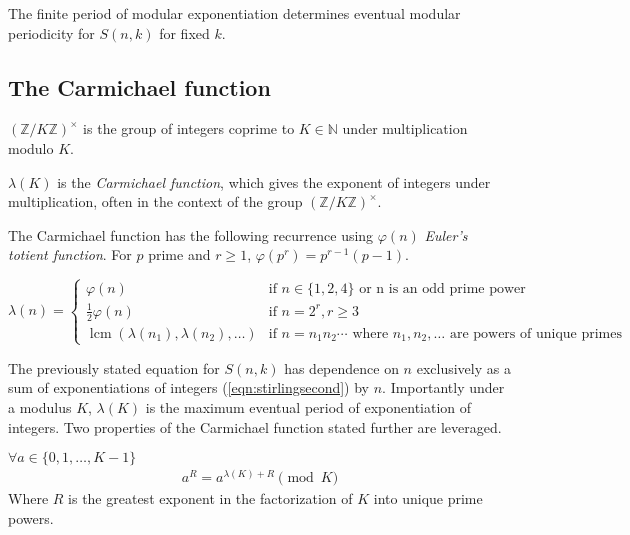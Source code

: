 \documentclass[12pt,reqno]{article}
\DeclareMathOperator{\lcm}{lcm}
\begin{document}
The finite period of modular exponentiation determines eventual modular periodicity for $S(n,k)$ for fixed $k$.

\subsection{The Carmichael function}
\begin{definition}
	$(\mathbb{Z}/K\mathbb{Z})^{\times}$ is the group of integers coprime to $K \in \mathbb{N}$ under multiplication modulo $K$.
\end{definition}
\begin{definition}
	$\lambda(K)$ is the {\em Carmichael function}, which gives the exponent of integers under multiplication, often in the context of the group $(\mathbb{Z}/K\mathbb{Z})^{\times}$.
\end{definition}

The Carmichael function has the following recurrence \cite{cc:carmichaelwiki} using $\varphi(n)$ {\em Euler's totient function}. For $p$ prime and $r \geq 1$, $\varphi(p^{r}) = p^{r - 1} (p - 1)$.

\begin{equation}
	\lambda(n) = \begin{cases}
		\varphi(n) & \text{if } n \in \{1,2,4\} \text{ or n is an odd prime power}
		\\
		\frac{1}{2}\varphi(n) & \text{if } n = 2^{r}, r \geq 3
		\\
		\lcm (\lambda(n_{1}), \lambda(n_{2}), \ldots) & \text{if } n = n_{1}n_{2} \cdots \text{ where } n_{1}, n_{2}, \ldots \text{ are powers of unique primes}
	\end{cases}\label{eqn:carmichaelrecur}
\end{equation}



The previously stated equation for $S(n,k)$ has dependence on $n$ exclusively as a sum of exponentiations of integers (\ref{eqn:stirlingsecond}) by $n$. Importantly under a modulus $K$, $\lambda(K)$ is the maximum eventual period of exponentiation of integers. Two properties of the Carmichael function stated further are leveraged.
\begin{proposition}
	$\forall a \in \{0, 1, \ldots, K - 1\}$
	\begin{align}
		a^{R} = a^{\lambda(K) + R} \pmod {K}
	\end{align}
	Where $R$ is the greatest exponent in the factorization of $K$ into unique prime powers.
\end{proposition}
\end{document}
